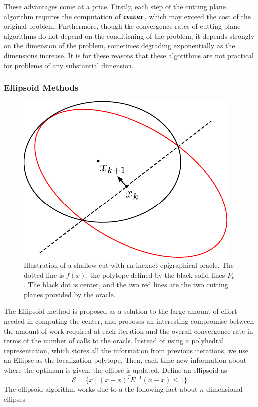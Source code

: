 These advantages come at a price. Firstly, each step of the cutting
plane algorithm requires the computation of ${\bf center}$, which may
exceed the cost of the original problem. Furthermore, though the
convergence rates of cutting plane algorithms do not depend on the
conditioning of the problem, it depends strongly on the dimension of
the problem, sometimes degrading exponentially as the dimensions
increase. It is for these reasons that these algorithms are not
practical for problems of any substantial dimension.


\subsubsection{Ellipsoid Methods}

\begin{figure} 
\begin{centering}
\includegraphics[scale=1.1]{cutting/ellipsoid.pdf}
\par\end{centering}
\caption{Illustration of a shallow cut with an inexact epigraphical oracle. The dotted
line is $f(x)$, the polytope defined by the black solid lines $P_k$. The black
dot is center, and the two red lines are the two cutting planes provided by the 
oracle.} \label{fig:approx-oracle}
\end{figure}

The Ellipsoid method \cite{bland1981ellipsoid} is proposed as a solution
to the large amount of effort needed in computing the center, and 
proposes an interesting compromise between the amount of work required
at each iteration and the overall convergence rate in terms of the
number of calls to the oracle. Instead of 
using a polyhedral representation, which stores all the information
from previous iterations, we use an Ellipse as the
localization polytope. Then, each time new information about where the
optimum is given, the ellipse is updated. Define an ellipsoid as
$$\mathcal{E} = \{ x \mid (x - \bar{x})^T E^{-1} (x - \bar{x}) \leq 1\}$$
The ellipsoid algorithm works due to a the following fact about $n$-dimensional ellipses

